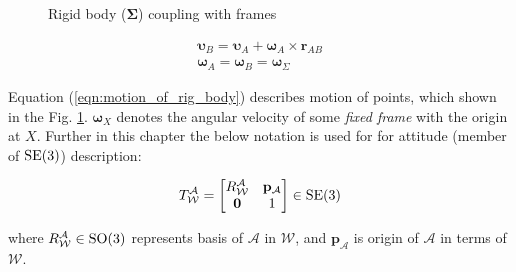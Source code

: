 \begin{figure}[H]
    \caption{Rigid body ($\boldsymbol{\Sigma}$) coupling with frames}
    \label{fig:coupling_rigid_body}
\end{figure}

\begin{equation}
    \begin{aligned}
        \boldsymbol{\upsilon}_B = \boldsymbol{\upsilon}_A + 
        \boldsymbol{\omega}_A \times \mathbf{r}_{AB} \\
        \boldsymbol{\omega}_A = \boldsymbol{\omega}_B 
        = \boldsymbol{\omega}_{\Sigma}
    \end{aligned}
    \label{eqn:motion_of_rig_body}
\end{equation}

Equation (\ref{eqn:motion_of_rig_body}) describes motion of points, which 
shown in the Fig. {\ref{fig:coupling_rigid_body}}. $\boldsymbol{\omega}_X$ 
denotes the angular velocity of some \emph{fixed frame} with the origin at $X$.
Further in this chapter the below notation is used for for attitude (member of $\text{SE}(3)$) 
description:

\begin{equation}
    T_{\mathcal{W}}^{\mathcal{A}} = 
    \begin{bmatrix}
        R^{\mathcal{A}}_{\mathcal{W}} & \mathbf{p}_{\mathcal{A}} \\
        \mathbf{0} & 1
    \end{bmatrix}
    \in \text{SE}(3)
    \label{eqn:se_3_element}
\end{equation}

where $R^{\mathcal{A}}_{\mathcal{W}} \in \text{SO}(3)$ represents basis of $\mathcal{A}$ 
in $\mathcal{W}$, and $\mathbf{p}_{\mathcal{A}}$ is origin of $\mathcal{A}$ in 
terms of $\mathcal{W}$.

